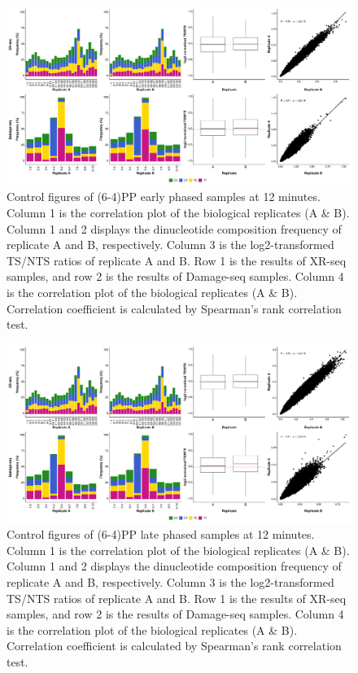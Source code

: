 \begin{figure}[H]
\begin{center}
\includegraphics[width=\textwidth]{Chapters/7_appendix/figures/supfig3}
\caption[Control figures of (6-4)PP early phased samples at 12 minutes.]{Control figures of (6-4)PP early phased samples at 12 minutes. Column 1 is the correlation plot of the biological replicates (A \& B). Column 1 and 2 displays the dinucleotide composition frequency of replicate A and B, respectively. Column 3 is the log2-transformed TS/NTS ratios of replicate A and B. Row 1 is the results of XR-seq samples, and row 2 is the results of Damage-seq samples. Column 4 is the correlation plot of the biological replicates (A \& B). Correlation coefficient is calculated by Spearman’s rank correlation test.}
\label{supfig:control2}
\end{center}
\end{figure}


\begin{figure}[H]
\begin{center}
\includegraphics[width=\textwidth]{Chapters/7_appendix/figures/supfig4}
\caption[Control figures of (6-4)PP late phased samples at 12 minutes.]{Control figures of (6-4)PP late phased samples at 12 minutes. Column 1 is the correlation plot of the biological replicates (A \& B). Column 1 and 2 displays the dinucleotide composition frequency of replicate A and B, respectively. Column 3 is the log2-transformed TS/NTS ratios of replicate A and B. Row 1 is the results of XR-seq samples, and row 2 is the results of Damage-seq samples. Column 4 is the correlation plot of the biological replicates (A \& B). Correlation coefficient is calculated by Spearman’s rank correlation test.}
\label{supfig:control3}
\end{center}
\end{figure}


